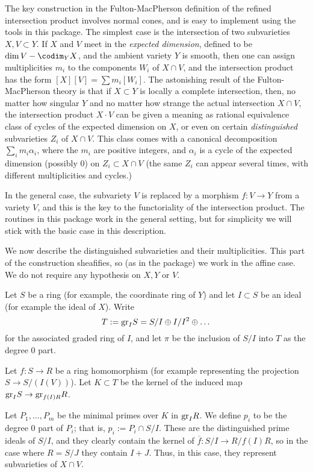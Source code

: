 \documentclass[twoside,12pt, leqno]{amsart}
\def\gr{{\rm gr}}
\begin{document}
The key construction in the Fulton-MacPherson definition of the refined intersection  product 
\cite[Section 6.1]{F}
involves normal cones, and is easy to implement using the tools in this package. The simplest case is the intersection of two subvarieties $X,V\subset Y$. If $X$ and $V$ meet in the \emph{expected dimension}, defined to be $\dim V - \codim_{Y} X$,
and the ambient variety $Y$ is smooth, then one can assign multiplicities $m_{i}$ to the components $W_{i}$ of $X\cap V$, and the 
intersection product has the form $[X][V] = \sum m_{i}[W_{i}].$
The astonishing result of the Fulton-MacPherson theory is that if $X\subset Y$ is locally a complete intersection, then, no matter how singular $Y$ and no matter how strange the actual intersection $X\cap V$, the intersection product 
$X\cdot V$ can be given a meaning as rational equivalence class of cycles of the expected dimension on $X$, or even on certain \emph{distinguished} subvarieties $Z_{i}$ of $X\cap V$. This class comes with a canonical decomposition $\sum_{i}m_{i}\alpha_{i}$, 
where the $m_{i}$ are positive integers, and $\alpha_{i}$ is a cycle of the expected dimension (possibly 0)
on  $Z_{i}\subset X\cap V$ (the same $Z_{i}$ can appear several times, with different multiplicities and cycles.)

In the general case, the subvariety $V$ is replaced by a morphism $f:V\to Y$ from a variety $V$, and this is the key to the functoriality of the intersection product. The routines in this package work in the general setting, but for simplicity we will stick with the basic case in this description.

We now describe the distinguished subvarieties and their multiplicities. This part of the construction sheafifies, so (as in the package) we work in the affine case. We do not require any hypothesis on $X, Y$ or $V$. 

Let $S$ be a ring (for example, the coordinate ring of $Y$) and let $I\subset S$ be an ideal (for example the ideal of $X$).
Write
$$
T:=\gr_{I}S = S/I\oplus I/I^{2}\oplus\dots
$$ 
for the associated graded ring  of $I$, and let
$\pi$ be the inclusion of $S/I$ into $T$ as the degree 0 part.

Let $f:S\to R$ be a ring homomorphism (for example representing the projection $S\to S/(I(V))$). Let $K\subset T$ be the kernel of the induced map $ \gr_{I}S \to \gr_{f(I)R}R$.  

Let $P_{1},\dots, P_{m}$ be the minimal primes over $K$ in $\gr_{I}R$. We define $p_{i}$ to be the degree 0 part of $P_{i}$; that is, $p_{i} := P_{i}\cap S/I$. These are the distinguished prime ideals of $S/I$, and they clearly contain the kernel of $\overline f: S/I \to R/f(I)R$, so in the case where $R = S/J$ they contain $I+J$.  Thus, in this case, they  represent subvarieties
of $X\cap V$.
\end{document}
